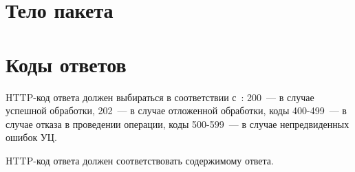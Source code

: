 \section{Тело пакета}\label{TRANSPORT.Body}


\section{Коды ответов}\label{TRANSPORT.Codes}

HTTP-код ответа должен выбираться в соответствии с~\cite{HTTP}: 
200~--- в случае успешной обработки, 
202~--- в случае отложенной обработки,
коды 400-499~--- в случае отказа в проведении операции,
коды 500-599~--- в случае непредвиденных ошибок УЦ.

HTTP-код ответа должен соответствовать содержимому ответа.


